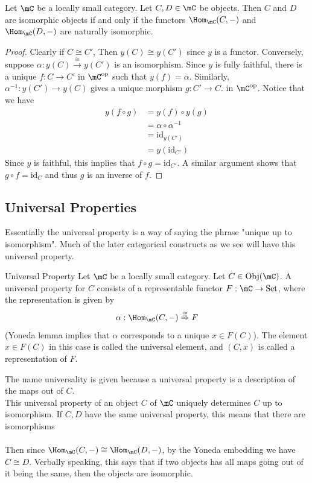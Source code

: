 \documentclass[a4paper]{article}
\begin{document}
\begin{crl}{}{} Let $\mC$ be a locally small category. Let $C,D\in\mC$ be objects. Then $C$ and $D$ are isomorphic objects if and only if the functors $\Hom_\mC(C,-)$ and $\Hom_\mC(D,-)$ are naturally isomorphic. 
\begin{proof}
Clearly if $C\cong C'$, Then $y(C)\cong y(C')$ since $y$ is a functor. Conversely, suppose $\alpha:y(C)\overset{\cong}{\rightarrow}y(C')$ is an isomorphism. Since $y$ is fully faithful, there is a unique $f:C\to C'$ in $\mC^{\text{op}}$ such that $y(f)=\alpha$. Similarly, $\alpha^{-1}:y(C')\to y(C)$ gives a unique morphism $g:C'\to C$. in $\mC^{\text{op}}$. Notice that we have
\begin{align*}
y(f\circ g)&=y(f)\circ y(g)\\
&=\alpha\circ\alpha^{-1}\\
&=\text{id}_{y(C')}\\
&=y(\text{id}_{C'})
\end{align*}
Since $y$ is faithful, this implies that $f\circ g=\text{id}_{C'}$. A similar argument shows that $g\circ f=\text{id}_C$ and thus $g$ is an inverse of $f$. 
\end{proof}
\end{crl}

\subsection{Universal Properties}
Essentially the universal property is a way of saying the phrase "unique up to isomorphism". Much of the later categorical constructs as we see will have this universal property. 

\begin{defn}{Universal Property}{} Let $\mC$ be a locally small category. Let $C\in\text{Obj}(\mC)$. A universal property for $C$ consists of a representable functor $F:\mC\to\text{Set}$, where the representation is given by $$\alpha:\Hom_\mC(C,-)\overset{\cong}{\Rightarrow}F$$ (Yoneda lemma implies that $\alpha$ corresponds to a unique $x\in F(C)$). The element $x\in F(C)$ in this case is called the universal element, and $(C,x)$ is called a representation of $F$. 
\end{defn}

The name universality is given because a universal property is a description of the maps out of $C$. \\
This universal property of an object $C$ of $\mC$ uniquely determines $C$ up to isomorphism. If $C,D$ have the same universal property, this means that there are isomorphisms \\
\\ Then since $\Hom_\mC(C,-)\cong\Hom_\mC(D,-)$, by the Yoneda embedding we have $C\cong D$. Verbally speaking, this says that if two objects has all maps going out of it being the same, then the objects are isomorphic. 
\end{document}
